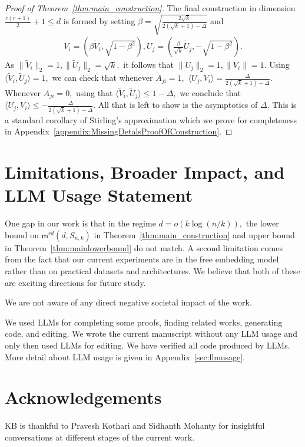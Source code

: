 \documentclass[preprint]{article}
\newcommand{\maxmargin}{\mathsf{m}^{rd}}
\newcommand{\tV}{\widetilde{V}}
\newcommand{\tU}{\widetilde{U}}
\newcommand{\ksparsen}{S_{n,k}}
\begin{document}
\begin{proof}[Proof of Theorem~\ref{thm:main_construction}]
The final construction in dimension $\frac{r(r+1)}{2} + 1\le d$ is formed by setting $\beta = \sqrt{\frac{2\sqrt{k}}{2(\sqrt{k}+1) - \Delta}}$ and 
\begin{align*}
 V_i = (\beta\tV_i, \sqrt{1-\beta^2}),
 U_j = (\frac{\beta}{\sqrt{k}}\tU_j, -\sqrt{1-\beta^2}).
\end{align*}
As $\|\tV_i\|_2 = 1, \|\tU_j\|_2 = \sqrt{k},$ it follows that $\|U_j\|_2 = 1, \|V_i\| = 1.$ Using $\langle \tV_i, \tU_j\rangle = 1,$ we can check that whenever $A_{ji} = 1,$
$\langle U_j, V_i\rangle = \frac{\Delta}{2(\sqrt{k}+1) - \Delta}.$ Whenever $A_{ji} = 0,$ using that 
$\langle \tV_i, \tU_j\rangle \le 1 - \Delta,$ we conclude that 
$\langle U_j, V_i\rangle \le - \frac{\Delta}{2(\sqrt{k}+1) - \Delta}.$
All that is left to show is the asymptotics of $\Delta.$ This is a standard corollary of Stirling's approximation which we prove for completeness in Appendix~\ref{appendix:MissingDetalsProofOfConstruction}.
\end{proof}




\section{Limitations, Broader Impact, and LLM Usage Statement}
\label{sec:limitations}
One gap in our work is that in the regime $d= o(k\log(n/k)),$ the lower bound on $\maxmargin(d, \ksparsen)$ in Theorem~\ref{thm:main_construction} and upper bound in Theorem~\ref{thm:mainlowerbound} do not match. A second limitation comes from the fact that our current experiments are in the free embedding model rather than on practical datasets and architectures. We believe that both of these are exciting directions for future study. 

We are not aware of any direct negative societal impact of the work. 

We used LLMs for completing some proofs, finding related works, generating code, and editing. We wrote the current manuscript without any LLM usage and only then used
LLMs for editing. We have verified all code produced by LLMs. More detail about LLM usage is given in Appendix~\ref{sec:llmusage}.  

\section*{Acknowledgements}
KB is thankful to Pravesh Kothari and Sidhanth Mohanty for insightful conversations at different stages of the current work.  
\end{document}

